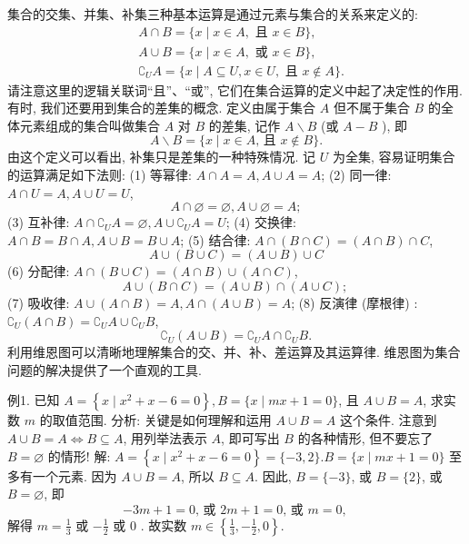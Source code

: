 
集合的交集、并集、补集三种基本运算是通过元素与集合的关系来定义的:
$$
\begin{aligned}
& A \cap B=\{x \mid x \in A, \text { 且 } x \in B\}, \\
& A \cup B=\{x \mid x \in A, \text { 或 } x \in B\}, \\
& \complement_U A=\{x \mid A \subseteq U, x \in U, \text { 且 } x \notin A\} .
\end{aligned}
$$
请注意这里的逻辑关联词“且”、“或”, 它们在集合运算的定义中起了决定性的作用.
有时, 我们还要用到集合的差集的概念.
定义由属于集合 $A$ 但不属于集合 $B$ 的全体元素组成的集合叫做集合
$A$ 对 $B$ 的差集, 记作 $A \backslash B$ (或 $A-B$ ), 即
$$
A \backslash B=\{x \mid x \in A \text {, 且 } x \notin B\} .
$$
由这个定义可以看出, 补集只是差集的一种特殊情况.
记 $U$ 为全集, 容易证明集合的运算满足如下法则:
(1) 等幂律: $A \cap A=A, A \cup A=A$;
(2) 同一律: $A \cap U=A, A \cup U=U$,
$$
A \cap \varnothing=\varnothing, A \cup \varnothing=A ;
$$
(3) 互补律: $A \cap \complement_U A=\varnothing, A \cup \complement_U A=U$;
(4) 交换律: $A \cap B=B \cap A, A \cup B=B \cup A$;
(5) 结合律: $A \cap(B \cap C)=(A \cap B) \cap C$,
$$
A \cup(B \cup C)=(A \cup B) \cup C
$$
(6) 分配律: $A \cap(B \cup C)=(A \cap B) \cup(A \cap C)$,
$$
A \cup(B \cap C)=(A \cup B) \cap(A \cup C) \text {; }
$$
(7) 吸收律: $A \cup(A \cap B)=A, A \cap(A \cup B)=A$;
(8) 反演律 (摩根律) : $\complement_U(A \cap B)=\complement_U A \cup \complement_U B$,
$$
\complement_U(A \cup B)=\complement_U A \cap \complement_U B .
$$
利用维恩图可以清晰地理解集合的交、并、补、差运算及其运算律.
维恩图为集合问题的解决提供了一个直观的工具.



例1. 已知 $A=\left\{x \mid x^2+x-6=0\right\}, B=\{x \mid m x+1=0\}$, 且 $A \cup B=A$, 求实数 $m$ 的取值范围.
分析: 关键是如何理解和运用 $A \cup B=A$ 这个条件.
注意到 $A \cup B=A \Leftrightarrow B \subseteq A$, 用列举法表示 $A$, 即可写出 $B$ 的各种情形, 但不要忘了 $B=\varnothing$ 的情形!
解: $A=\left\{x \mid x^2+x-6=0\right\}=\{-3,2\} . B=\{x \mid m x+1=0\}$ 至多有一个元素.
因为 $A \cup B=A$, 所以 $B \subseteq A$. 因此, $B=\{-3\}$, 或 $B=\{2\}$, 或 $B=\varnothing$, 即
$$
-3 m+1=0 \text {, 或 } 2 m+1=0 \text {, 或 } m=0 \text {, }
$$
解得 $m=\frac{1}{3}$ 或 $-\frac{1}{2}$ 或 0 .
故实数 $m \in\left\{\frac{1}{3},-\frac{1}{2}, 0\right\}$.




